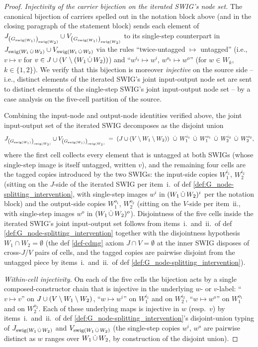 \documentclass[main]{subfiles}
\begin{document}
\begin{proof}
\medskip\noindent\emph{Injectivity of the carrier bijection on the iterated SWIG's node set.}
The canonical bijection of carriers spelled out in the notation block above (and in the closing paragraph of the statement block) sends each element of $J_{\left ( G_{\mathrm{swig}(W_1)} \right )_{\mathrm{swig}(W_2)}} \cup V_{\left ( G_{\mathrm{swig}(W_1)} \right )_{\mathrm{swig}(W_2)}}$ to its single-step counterpart in $J_{\mathrm{swig}(W_1 \,\dot{\cup}\, W_2)} \cup V_{\mathrm{swig}(W_1 \,\dot{\cup}\, W_2)}$ via the rules ``twice-untagged $\mapsto$ untagged'' (i.e., $v \mapsto v$ for $v \in J \cup (V \setminus (W_1 \,\dot{\cup}\, W_2))$) and ``$w^{i_k} \mapsto w^i$, $w^{o_k} \mapsto w^o$'' (for $w \in W_k$, $k \in \{1, 2\}$). We verify that this bijection is moreover \emph{injective} on the source side -- i.e., distinct elements of the iterated SWIG's joint input-output node set are sent to distinct elements of the single-step SWIG's joint input-output node set -- by a case analysis on the five-cell partition of the source.

Combining the input-node and output-node identities verified above, the joint input-output set of the iterated SWIG decomposes as the disjoint union
\[
    J_{\left ( G_{\mathrm{swig}(W_1)} \right )_{\mathrm{swig}(W_2)}} \cup V_{\left ( G_{\mathrm{swig}(W_1)} \right )_{\mathrm{swig}(W_2)}}
    \;=\; \left ( J \cup (V \setminus W_1 \setminus W_2) \right ) \;\,\dot{\cup}\,\; W_1^{i_1} \;\,\dot{\cup}\,\; W_1^{o_1} \;\,\dot{\cup}\,\; W_2^{i_2} \;\,\dot{\cup}\,\; W_2^{o_2},
\]
where the first cell collects every element that is untagged at both SWIGs (whose single-step image is itself untagged, written $v$), and the remaining four cells are the tagged copies introduced by the two SWIGs: the input-side copies $W_1^{i_1}$, $W_2^{i_2}$ (sitting on the $J$-side of the iterated SWIG per item~i.\ of def \ref{def:G_node-splitting_intervention}, with single-step images $w^i$ in $(W_1 \,\dot{\cup}\, W_2)^i$ per the notation block) and the output-side copies $W_1^{o_1}$, $W_2^{o_2}$ (sitting on the $V$-side per item~ii., with single-step images $w^o$ in $(W_1 \,\dot{\cup}\, W_2)^o$). Disjointness of the five cells inside the iterated SWIG's joint input-output set follows from items~i.\ and~ii.\ of def \ref{def:G_node-splitting_intervention} together with the disjointness hypothesis $W_1 \cap W_2 = \emptyset$ (the def \ref{def-cdmg} axiom $J \cap V = \emptyset$ at the inner SWIG disposes of cross-$J$/$V$ pairs of cells, and the tagged copies are pairwise disjoint from the untagged piece by items~i.\ and~ii.\ of def \ref{def:G_node-splitting_intervention}).

\emph{Within-cell injectivity.} On each of the five cells the bijection acts by a single composed-constructor chain that is injective in the underlying $w$- or $v$-label: ``$v \mapsto v$'' on $J \cup (V \setminus W_1 \setminus W_2)$, ``$w \mapsto w^i$'' on $W_1^{i_1}$ and on $W_2^{i_2}$, ``$w \mapsto w^o$'' on $W_1^{o_1}$ and on $W_2^{o_2}$. Each of these underlying maps is injective in $w$ (resp.\ $v$) by items~i.\ and~ii.\ of def \ref{def:G_node-splitting_intervention}'s disjoint-union typing of $J_{\mathrm{swig}(W_1 \,\dot{\cup}\, W_2)}$ and $V_{\mathrm{swig}(W_1 \,\dot{\cup}\, W_2)}$ (the single-step copies $w^i$, $w^o$ are pairwise distinct as $w$ ranges over $W_1 \,\dot{\cup}\, W_2$, by construction of the disjoint union).


\end{proof}
\end{document}
